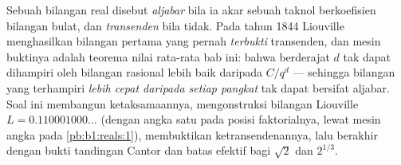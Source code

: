 \begin{problem}
\label{pb:b1:derivative:1}
Sebuah bilangan real disebut \emph{aljabar} bila ia akar sebuah
 taknol berkoefisien bilangan bulat, dan \emph{transenden}
bila tidak. Pada tahun 1844 Liouville menghasilkan bilangan pertama yang pernah
\emph{terbukti} transenden, dan mesin buktinya adalah
teorema nilai rata-rata bab ini: bahwa  berderajat $d$
tak dapat dihampiri oleh bilangan rasional lebih baik daripada $C/q^d$ --- sehingga
bilangan yang terhampiri \emph{lebih cepat daripada setiap pangkat} tak dapat
bersifat aljabar. Soal ini membangun ketaksamaannya, mengonstruksi
bilangan Liouville $L = 0.110001000\dots$ (dengan angka satu pada posisi
faktorialnya, lewat mesin angka pada \cref{pb:b1:reals:1}),
membuktikan ketransendenannya, lalu berakhir dengan bukti tandingan Cantor dan
batas efektif bagi $\sqrt2$ dan
$2^{1/3}$.


\end{problem}
